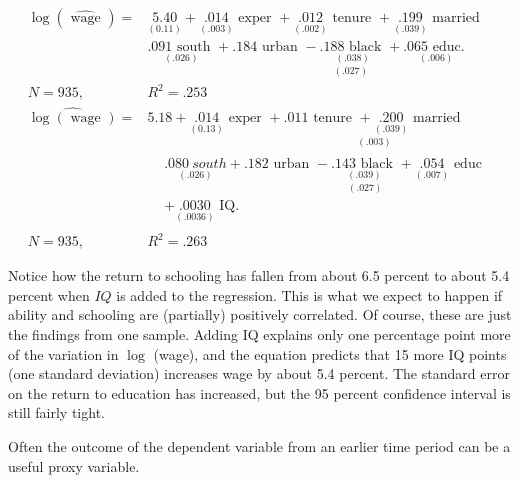 \documentclass[10pt]{article}
\begin{document}
$$
\begin{aligned}
\log (\widehat{\text { wage }})= & \underset{(0.11)}{5.40}+\underset{(.003)}{.014} \text { exper }+\underset{(.002)}{.012} \text { tenure }+\underset{(.039)}{.199} \text { married } \\
& \underset{(.026)}{.091 \text { south }}+\underset{(.027)}{.184 \text { urban }-\underset{(.038)}{.188 \text { black }}+\underset{(.006)}{.065 \text { educ. }}} \\
N=935, & R^{2}=.253 \\
\widehat{\log (\text { wage })}= & 5.18+\underset{(0.13)}{.014} \text { exper }+\underset{(.003)}{.011 \text { tenure }+\underset{(.039)}{.200} \text { married }} \\
& \begin{aligned}
& \underset{(.026)}{.080 ~ s o u t h}+\underset{(.027)}{.182 \text { urban }-\underset{(.039)}{.143 \text { black }}+\underset{(.007)}{.054} \text { educ }} \\
& +\underset{(.0036)}{.0030} \text { IQ. }
\end{aligned} \\
N=935, \quad & R^{2}=.263
\end{aligned}
$$

Notice how the return to schooling has fallen from about 6.5 percent to about 5.4 percent when $I Q$ is added to the regression. This is what we expect to happen if ability and schooling are (partially) positively correlated. Of course, these are just the findings from one sample. Adding IQ explains only one percentage point more of the variation in $\log$ (wage), and the equation predicts that 15 more IQ points (one standard deviation) increases wage by about 5.4 percent. The standard error on the return to education has increased, but the 95 percent confidence interval is still fairly tight.

Often the outcome of the dependent variable from an earlier time period can be a useful proxy variable.
\end{document}
